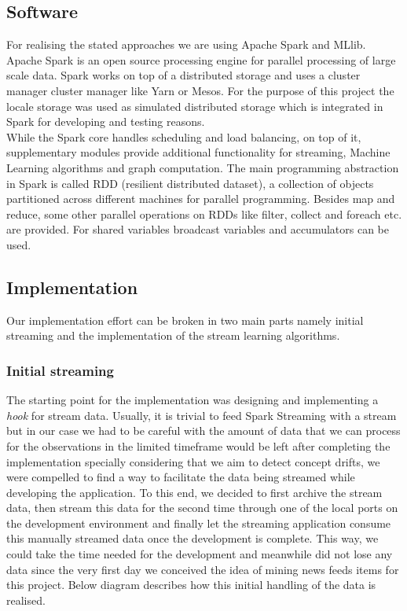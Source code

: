 \documentclass{article} %
\begin{document}
\subsection{Software}
For realising the stated approaches we are using Apache Spark and MLlib. Apache Spark is an open source processing engine for parallel processing of large scale data. Spark works on top of a distributed storage and uses a cluster manager cluster manager like Yarn or Mesos. For the purpose of this project the locale storage was used as simulated distributed storage which is integrated in Spark for developing and testing reasons.  \\
While the Spark core handles scheduling and load balancing, on top of it, supplementary modules provide additional functionality for streaming, Machine Learning  algorithms and graph computation. The main programming abstraction in Spark is called RDD (resilient distributed dataset), a collection of objects partitioned across different machines for parallel programming. Besides map and reduce, some other parallel operations on RDDs like filter, collect and foreach etc. are provided. For shared variables broadcast variables and  accumulators can be used.

\subsection{Implementation}

Our implementation effort can be broken in two main parts namely initial streaming and the implementation of the stream learning algorithms.

\subsubsection{Initial streaming}

The starting point for the implementation was designing and implementing a \textit{hook} for stream data. Usually, it is trivial to feed Spark Streaming with a stream but in our case we had to be careful with the amount of data that we can process for the observations in the limited timeframe would be left after completing the implementation  specially considering that we aim to detect concept drifts, we were compelled to find a way to facilitate the data being streamed while developing the application. To this end, we decided to first archive the stream data, then stream this data for the second time through one of the local ports on the development environment and finally let the streaming application consume this manually streamed data once the development is complete. This way, we could take the time needed for the development and meanwhile did not lose any data since the very first day we conceived the idea of mining news feeds items for this project. Below diagram describes how this initial handling of the data is realised. 
\end{document}
